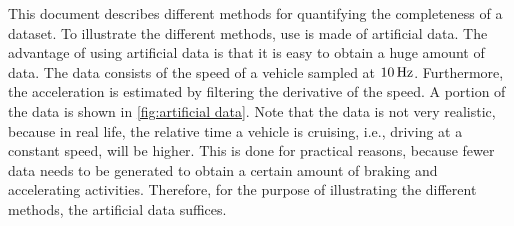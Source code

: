 \documentclass[10pt,final,a4paper,oneside,onecolumn]{article}
\theoremstyle{plain}\newtheorem{definition}{Definition}[section]    %
\theoremstyle{definition}\newtheorem{example}{Example}[section]     %
\theoremstyle{remark}\newtheorem{remarkenv}{Remark}[section]        %
\begin{document}
%		

This document describes different methods for quantifying the completeness of a dataset. To illustrate the different methods, use is made of artificial data. The advantage of using artificial data is that it is easy to obtain a huge amount of data. The data consists of the speed of a vehicle sampled at $\unit[10]{Hz}$. Furthermore, the acceleration is estimated by filtering the derivative of the speed. A portion of the data is shown in \cref{fig:artificial data}. Note that the data is not very realistic, because in real life, the relative time a vehicle is cruising, i.e., driving at a constant speed, will be higher. This is done for practical reasons, because fewer data needs to be generated to obtain a certain amount of braking and accelerating activities. Therefore, for the purpose of illustrating the different methods, the artificial data suffices.
\end{document}
